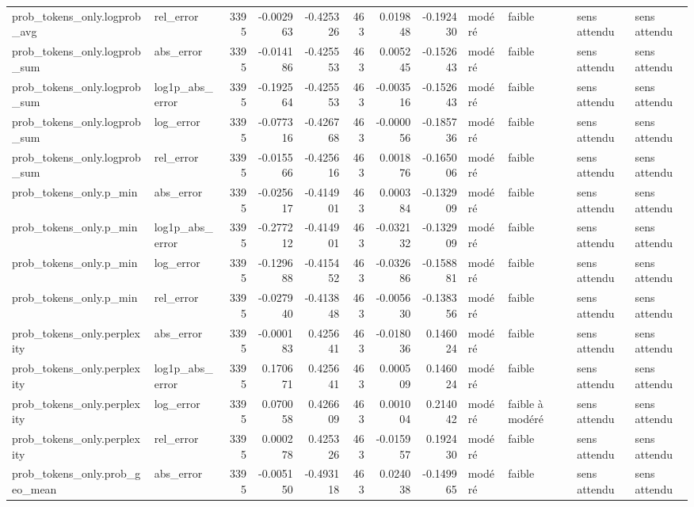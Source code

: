 \begin{longtable}{llrrrrrrllll}
prob\_tokens\_only.logprob\_avg & rel\_error & 3395 & -0.002963 & -0.425326 & 463 & 0.019848 & -0.192430 & modéré & faible & sens attendu & sens attendu \\
prob\_tokens\_only.logprob\_sum & abs\_error & 3395 & -0.014186 & -0.425553 & 463 & 0.005245 & -0.152643 & modéré & faible & sens attendu & sens attendu \\
prob\_tokens\_only.logprob\_sum & log1p\_abs\_error & 3395 & -0.192564 & -0.425553 & 463 & -0.003516 & -0.152643 & modéré & faible & sens attendu & sens attendu \\
prob\_tokens\_only.logprob\_sum & log\_error & 3395 & -0.077316 & -0.426768 & 463 & -0.000056 & -0.185736 & modéré & faible & sens attendu & sens attendu \\
prob\_tokens\_only.logprob\_sum & rel\_error & 3395 & -0.015566 & -0.425616 & 463 & 0.001876 & -0.165006 & modéré & faible & sens attendu & sens attendu \\
prob\_tokens\_only.p\_min & abs\_error & 3395 & -0.025617 & -0.414901 & 463 & 0.000384 & -0.132909 & modéré & faible & sens attendu & sens attendu \\
prob\_tokens\_only.p\_min & log1p\_abs\_error & 3395 & -0.277212 & -0.414901 & 463 & -0.032132 & -0.132909 & modéré & faible & sens attendu & sens attendu \\
prob\_tokens\_only.p\_min & log\_error & 3395 & -0.129688 & -0.415452 & 463 & -0.032686 & -0.158881 & modéré & faible & sens attendu & sens attendu \\
prob\_tokens\_only.p\_min & rel\_error & 3395 & -0.027940 & -0.413848 & 463 & -0.005630 & -0.138356 & modéré & faible & sens attendu & sens attendu \\
prob\_tokens\_only.perplexity & abs\_error & 3395 & -0.000183 & 0.425641 & 463 & -0.018036 & 0.146024 & modéré & faible & sens attendu & sens attendu \\
prob\_tokens\_only.perplexity & log1p\_abs\_error & 3395 & 0.170671 & 0.425641 & 463 & 0.000509 & 0.146024 & modéré & faible & sens attendu & sens attendu \\
prob\_tokens\_only.perplexity & log\_error & 3395 & 0.070058 & 0.426609 & 463 & 0.001004 & 0.214042 & modéré & faible à modéré & sens attendu & sens attendu \\
prob\_tokens\_only.perplexity & rel\_error & 3395 & 0.000278 & 0.425326 & 463 & -0.015957 & 0.192430 & modéré & faible & sens attendu & sens attendu \\
prob\_tokens\_only.prob\_geo\_mean & abs\_error & 3395 & -0.005150 & -0.493118 & 463 & 0.024038 & -0.149965 & modéré & faible & sens attendu & sens attendu \\

\end{longtable}
